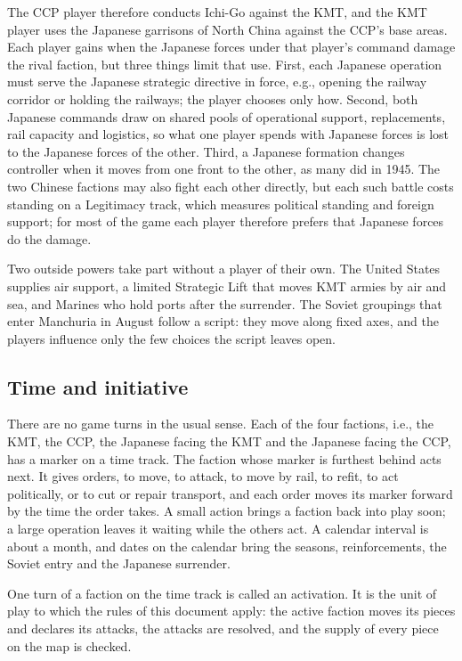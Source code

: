 \documentclass[11pt]{article}
\begin{document}
The CCP player therefore conducts Ichi-Go against the KMT, and the KMT player uses the Japanese garrisons of North China against the CCP's base areas. Each player gains when the Japanese forces under that player's command damage the rival faction, but three things limit that use. First, each Japanese operation must serve the Japanese strategic directive in force, e.g., opening the railway corridor or holding the railways; the player chooses only how. Second, both Japanese commands draw on shared pools of operational support, replacements, rail capacity and logistics, so what one player spends with Japanese forces is lost to the Japanese forces of the other. Third, a Japanese formation changes controller when it moves from one front to the other, as many did in 1945. The two Chinese factions may also fight each other directly, but each such battle costs standing on a Legitimacy track, which measures political standing and foreign support; for most of the game each player therefore prefers that Japanese forces do the damage.

Two outside powers take part without a player of their own. The United States supplies air support, a limited Strategic Lift that moves KMT armies by air and sea, and Marines who hold ports after the surrender. The Soviet groupings that enter Manchuria in August follow a script: they move along fixed axes, and the players influence only the few choices the script leaves open.

\subsection*{Time and initiative}
There are no game turns in the usual sense. Each of the four factions, i.e., the KMT, the CCP, the Japanese facing the KMT and the Japanese facing the CCP, has a marker on a time track. The faction whose marker is furthest behind acts next. It gives orders, to move, to attack, to move by rail, to refit, to act politically, or to cut or repair transport, and each order moves its marker forward by the time the order takes. A small action brings a faction back into play soon; a large operation leaves it waiting while the others act. A calendar interval is about a month, and dates on the calendar bring the seasons, reinforcements, the Soviet entry and the Japanese surrender.

One turn of a faction on the time track is called an activation. It is the unit of play to which the rules of this document apply: the active faction moves its pieces and declares its attacks, the attacks are resolved, and the supply of every piece on the map is checked.
\end{document}
